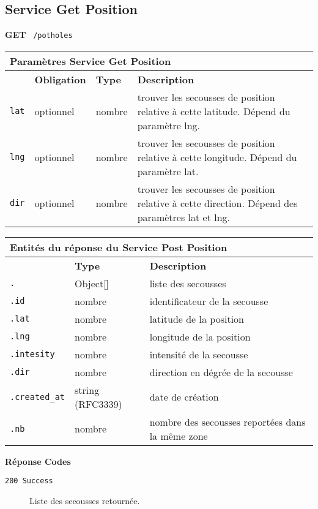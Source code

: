 \subsection{Service Get Position}
\label{appendix:sprint3-potholes-get-doc}

\textbf{GET} \ \texttt{/potholes}

\begin{table}[htbp]
    \centering
    \begin{tabularx}{\textwidth}{@{}p{2cm} p{2cm} p{2cm} p{7.7cm}@{}}
        \multicolumn{4}{X}{\textbf{Paramètres Service Get Position}} \\
        \toprule
        \rowcolor{gray!20}
        \multicolumn{1}{l}{\textbf{Élément}} &
        \multicolumn{1}{l}{\textbf{Obligation}} &
        \multicolumn{1}{l}{\textbf{Type}} &
        \multicolumn{1}{l}{\textbf{Description}} \\
        \midrule
        \verb|lat| & optionnel & nombre & trouver les secousses de position relative à cette latitude. Dépend du paramètre lng. \\
        \verb|lng| & optionnel & nombre & trouver les secousses de position relative à cette longitude. Dépend du paramètre lat. \\
        \verb|dir| & optionnel & nombre & trouver les secousses de position relative à cette direction. Dépend des paramètres lat et lng. \\
        \bottomrule
    \end{tabularx}
\end{table}

\begin{table}[htbp]
    \centering
    \begin{tabularx}{\textwidth}{@{}lll@{}}
        \multicolumn{3}{X}{\textbf{Entités du réponse du Service Post Position}} \\
        \toprule
        \rowcolor{gray!20}
        \multicolumn{1}{l}{\textbf{Élément}} &
        \multicolumn{1}{l}{\textbf{Type}} &
        \multicolumn{1}{l}{\textbf{Description}} \\
        \midrule
        \verb|.| & Object[] & liste des secousses \\
        \verb|.id| & nombre & identificateur de la secousse \\
        \verb|.lat| & nombre & latitude de la position \\
        \verb|.lng| & nombre & longitude de la position \\
        \verb|.intesity| & nombre & intensité de la secousse \\
        \verb|.dir| & nombre & direction en dégrée de la secousse \\
        \verb|.created_at| & string (RFC3339) & date de création \\
        \verb|.nb| & nombre & nombre des secousses reportées dans la même zone\\
        \bottomrule
    \end{tabularx}
\end{table}

\textbf{Réponse Codes}

\begin{description}
    \item[\texttt{200 Success}] Liste des secousses retournée.
\end{description}
